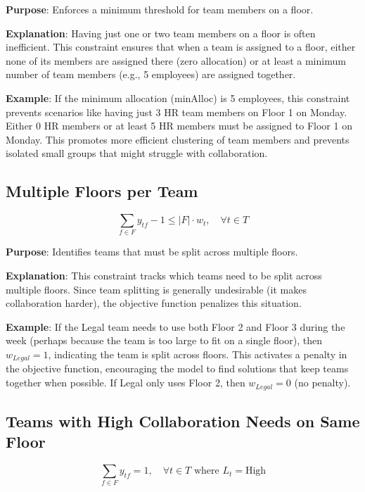 \documentclass[12pt,a4paper]{article}
\begin{document}
\textbf{Purpose}: Enforces a minimum threshold for team members on a floor.

\textbf{Explanation}: Having just one or two team members on a floor is often inefficient. This constraint ensures that when a team is assigned to a floor, either none of its members are assigned there (zero allocation) or at least a minimum number of team members (e.g., 5 employees) are assigned together.

\textbf{Example}: If the minimum allocation (minAlloc) is 5 employees, this constraint prevents scenarios like having just 3 HR team members on Floor 1 on Monday. Either 0 HR members or at least 5 HR members must be assigned to Floor 1 on Monday. This promotes more efficient clustering of team members and prevents isolated small groups that might struggle with collaboration.

\subsection{Multiple Floors per Team}

\begin{equation}
\sum_{f\in F} y_{tf} - 1 \leq |F| \cdot w_t, \quad \forall t \in T
\end{equation}

\textbf{Purpose}: Identifies teams that must be split across multiple floors.

\textbf{Explanation}: This constraint tracks which teams need to be split across multiple floors. Since team splitting is generally undesirable (it makes collaboration harder), the objective function penalizes this situation.

\textbf{Example}: If the Legal team needs to use both Floor 2 and Floor 3 during the week (perhaps because the team is too large to fit on a single floor), then $w_{Legal} = 1$, indicating the team is split across floors. This activates a penalty in the objective function, encouraging the model to find solutions that keep teams together when possible. If Legal only uses Floor 2, then $w_{Legal} = 0$ (no penalty).

\subsection{Teams with High Collaboration Needs on Same Floor}

\begin{equation}
\sum_{f\in F} y_{tf} = 1, \quad \forall t \in T \text{ where } L_t = \text{High}
\end{equation}
\end{document}
